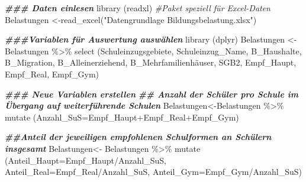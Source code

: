 \documentclass[
]{article}
\newenvironment{Shaded}{\begin{snugshade}}{\end{snugshade}}
\newcommand{\AttributeTok}[1]{\textcolor[rgb]{0.77,0.63,0.00}{#1}}
\newcommand{\CommentTok}[1]{\textcolor[rgb]{0.56,0.35,0.01}{\textit{#1}}}
\newcommand{\DocumentationTok}[1]{\textcolor[rgb]{0.56,0.35,0.01}{\textbf{\textit{#1}}}}
\newcommand{\FunctionTok}[1]{\textcolor[rgb]{0.00,0.00,0.00}{#1}}
\newcommand{\NormalTok}[1]{#1}
\newcommand{\OtherTok}[1]{\textcolor[rgb]{0.56,0.35,0.01}{#1}}
\newcommand{\SpecialCharTok}[1]{\textcolor[rgb]{0.00,0.00,0.00}{#1}}
\newcommand{\StringTok}[1]{\textcolor[rgb]{0.31,0.60,0.02}{#1}}
\begin{document}
\begin{Shaded}
\begin{Highlighting}[]
\DocumentationTok{\#\#\# Daten einlesen}
\FunctionTok{library}\NormalTok{ (readxl) }\CommentTok{\#Paket speziell für Excel{-}Daten}
\NormalTok{Belastungen }\OtherTok{\textless{}{-}}\FunctionTok{read\_excel}\NormalTok{(}\StringTok{"Datengrundlage Bildungsbelastung.xlsx"}\NormalTok{)}

\DocumentationTok{\#\#\#Variablen für Auswertung auswählen}
\FunctionTok{library}\NormalTok{ (dplyr)}
\NormalTok{Belastungen }\OtherTok{\textless{}{-}}\NormalTok{ Belastungen }\SpecialCharTok{\%\textgreater{}\%}
  \FunctionTok{select}\NormalTok{ (Schuleinzugsgebiete, Schuleinzug\_Name, B\_Haushalte, B\_Migration, B\_Alleinerziehend, B\_Mehrfamilienhäuser, SGB2, Empf\_Haupt, Empf\_Real, Empf\_Gym)}

\DocumentationTok{\#\#\# Neue Variablen erstellen}
\DocumentationTok{\#\# Anzahl der Schüler pro Schule im Übergang auf weiterführende Schulen}
\NormalTok{Belastungen}\OtherTok{\textless{}{-}}\NormalTok{Belastungen }\SpecialCharTok{\%\textgreater{}\%} 
  \FunctionTok{mutate}\NormalTok{ (}\AttributeTok{Anzahl\_SuS=}\NormalTok{Empf\_Haupt}\SpecialCharTok{+}\NormalTok{Empf\_Real}\SpecialCharTok{+}\NormalTok{Empf\_Gym)}

\DocumentationTok{\#\#Anteil der jeweiligen empfohlenen Schulformen an Schülern insgesamt}
\NormalTok{Belastungen}\OtherTok{\textless{}{-}}\NormalTok{ Belastungen }\SpecialCharTok{\%\textgreater{}\%} 
  \FunctionTok{mutate}\NormalTok{ (}\AttributeTok{Anteil\_Haupt=}\NormalTok{Empf\_Haupt}\SpecialCharTok{/}\NormalTok{Anzahl\_SuS,}
          \AttributeTok{Anteil\_Real=}\NormalTok{Empf\_Real}\SpecialCharTok{/}\NormalTok{Anzahl\_SuS,}
          \AttributeTok{Anteil\_Gym=}\NormalTok{Empf\_Gym}\SpecialCharTok{/}\NormalTok{Anzahl\_SuS)}
\end{Highlighting}
\end{Shaded}
\end{document}
